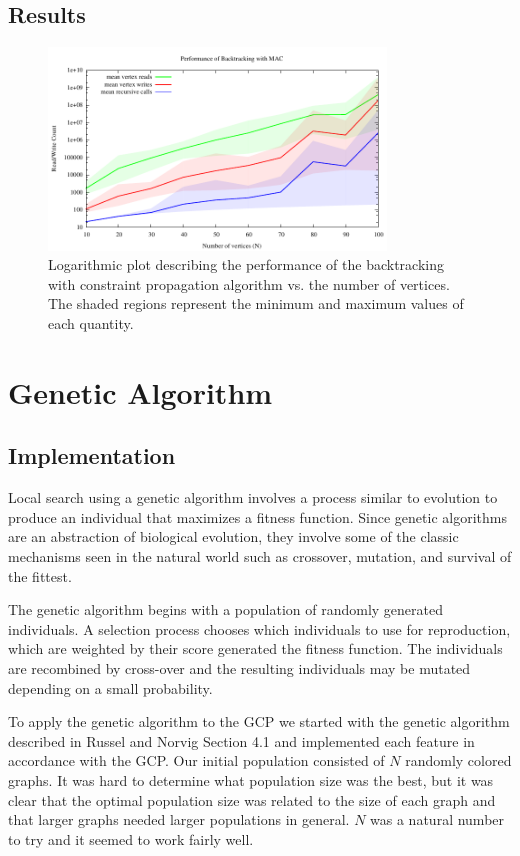 \documentclass{article}
\begin{document}
	\subsection{Results}
	
		\begin{figure}[h!]
			\centering
			\includegraphics[width=0.8\textwidth]{../results_5/backtracking_mac/bt_mac_performance}
			\caption{Logarithmic plot describing the performance of the backtracking with constraint propagation algorithm vs. the number of vertices. The shaded regions represent the minimum and maximum values of each quantity.}
		\end{figure}
	
\section{Genetic Algorithm}

	\subsection{Implementation}
	Local search using a genetic algorithm involves a process similar to evolution to produce an individual that maximizes a fitness function. Since genetic algorithms are an abstraction of biological evolution, they involve some of the classic mechanisms seen in the natural world such as crossover, mutation, and survival of the fittest\cite{genetic}.
	
	The genetic algorithm begins with a population of randomly generated individuals. A selection process chooses which individuals to use for reproduction, which are weighted by their score generated the fitness function. The individuals are recombined by cross-over and the resulting individuals may be mutated depending on a small probability.
	
	To apply the genetic algorithm to the GCP we started with the genetic algorithm described in Russel and Norvig Section 4.1\cite{ai} and implemented each feature in accordance with the GCP. Our initial population consisted of $N$ randomly colored graphs. It was hard to determine what population size was the best, but it was clear that the optimal population size was related to the size of each graph and that larger graphs needed larger populations in general. $N$ was a natural number to try and it seemed to work fairly well.
	
\end{document}
